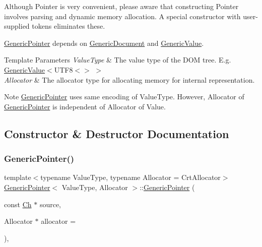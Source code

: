 Although Pointer is very convenient, please aware that constructing Pointer involves parsing and dynamic memory allocation. A special constructor with user-\/ supplied tokens eliminates these.

\hyperlink{a02232}{Generic\+Pointer} depends on \hyperlink{a01996}{Generic\+Document} and \hyperlink{a01992}{Generic\+Value}.


\begin{DoxyTemplParams}{Template Parameters}
{\em Value\+Type} & The value type of the D\+OM tree. E.\+g. \hyperlink{a01992}{Generic\+Value}$<$U\+T\+F8$<$$>$ $>$ \\
\hline
{\em Allocator} & The allocator type for allocating memory for internal representation.\\
\hline
\end{DoxyTemplParams}
\begin{DoxyNote}{Note}
\hyperlink{a02232}{Generic\+Pointer} uses same encoding of Value\+Type. However, Allocator of \hyperlink{a02232}{Generic\+Pointer} is independent of Allocator of Value. 
\end{DoxyNote}


\subsection{Constructor \& Destructor Documentation}
\mbox{\label{a02232_a4ad549b8a826c3c2dedf03fcc07be9b0}} 
\subsubsection{\texorpdfstring{Generic\+Pointer()}{GenericPointer()}\hspace{0.1cm}{\footnotesize\ttfamily [1/3]}}
{\footnotesize\ttfamily template$<$typename Value\+Type, typename Allocator = Crt\+Allocator$>$ \\
\hyperlink{a02232}{Generic\+Pointer}$<$ Value\+Type, Allocator $>$\+::\hyperlink{a02232}{Generic\+Pointer} (\begin{DoxyParamCaption}\item[{const \hyperlink{a02232_ab292356c11b4015c98d21b966b11f285}{Ch} $\ast$}]{source,  }\item[{Allocator $\ast$}]{allocator = {} }\end{DoxyParamCaption})\hspace{0.3cm}{\ttfamily [inline]}, {\ttfamily [explicit]}}



